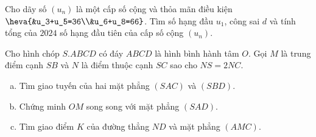\begin{bt}%
	Cho dãy số $(u_n)$ là một cấp số cộng và thỏa mãn điều kiện $\heva{&u_3+u_5=36\\&u_6+u_8=66}$. Tìm số hạng đầu $u_1$, công sai $d$ và tính tổng của $2024$ số hạng đầu tiên của cấp số cộng $\left(u_n\right)$.
	
\end{bt}
\begin{bt}%
	Cho hình chóp $S.ABCD$ có đáy $ABCD$ là hình bình hành tâm $O$. Gọi $M$ là trung điểm cạnh $SB$ và $N$ là điểm thuộc cạnh $SC$ sao cho $NS=2NC$.
	\begin{enumerate}[a)]
		\item Tìm giao tuyến của hai mặt phẳng $(SAC)$  và $(SBD)$.
		\item Chứng minh $OM$ song song với mặt phẳng $\left(SAD\right)$.
		\item Tìm giao điểm $K$ của đường thẳng $ND$ và mặt phẳng $\left(AMC\right)$.
	\end{enumerate}
\end{bt}
